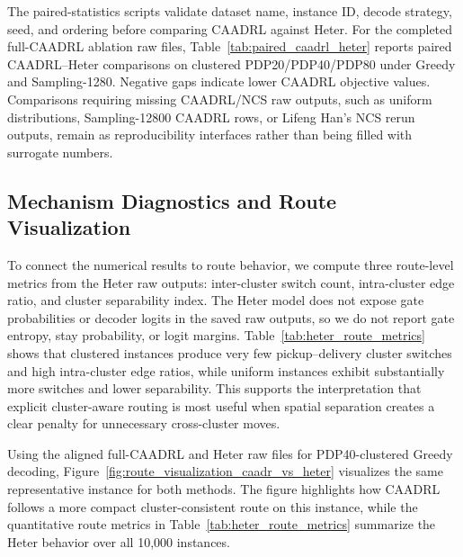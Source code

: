 \documentclass[pdflatex,sn-basic,Numbered]{sn-jnl}
\begin{document}
The paired-statistics scripts validate dataset name, instance ID, decode strategy, seed, and ordering before comparing CAADRL against Heter. For the completed full-CAADRL ablation raw files, Table~\ref{tab:paired_caadrl_heter} reports paired CAADRL--Heter comparisons on clustered PDP20/PDP40/PDP80 under Greedy and Sampling-1280. Negative gaps indicate lower CAADRL objective values. Comparisons requiring missing CAADRL/NCS raw outputs, such as uniform distributions, Sampling-12800 CAADRL rows, or Lifeng Han's NCS rerun outputs, remain as reproducibility interfaces rather than being filled with surrogate numbers.

\begin{table}[t]
\centering
\caption{Paired statistical comparison between CAADRL and Heter on aligned clustered 10,000-instance test sets. Negative gap means CAADRL obtains lower route length.}
\label{tab:paired_caadrl_heter}
\resizebox{\textwidth}{!}{}
\end{table}

\subsection{Mechanism Diagnostics and Route Visualization}

To connect the numerical results to route behavior, we compute three route-level metrics from the Heter raw outputs: inter-cluster switch count, intra-cluster edge ratio, and cluster separability index. The Heter model does not expose gate probabilities or decoder logits in the saved raw outputs, so we do not report gate entropy, stay probability, or logit margins. Table~\ref{tab:heter_route_metrics} shows that clustered instances produce very few pickup--delivery cluster switches and high intra-cluster edge ratios, while uniform instances exhibit substantially more switches and lower separability. This supports the interpretation that explicit cluster-aware routing is most useful when spatial separation creates a clear penalty for unnecessary cross-cluster moves.

\begin{table}[t]
\centering
\caption{Heter route-level mechanism metrics on unified 10,000-instance test sets.}
\label{tab:heter_route_metrics}
\resizebox{\textwidth}{!}{}
\end{table}

Using the aligned full-CAADRL and Heter raw files for PDP40-clustered Greedy decoding, Figure~\ref{fig:route_visualization_caadr_vs_heter} visualizes the same representative instance for both methods. The figure highlights how CAADRL follows a more compact cluster-consistent route on this instance, while the quantitative route metrics in Table~\ref{tab:heter_route_metrics} summarize the Heter behavior over all 10,000 instances.
\end{document}
